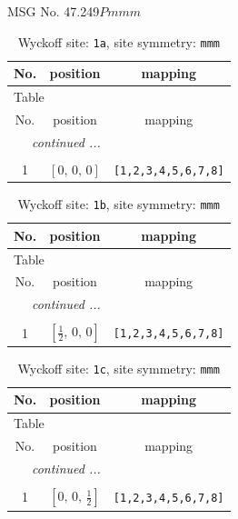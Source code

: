 \documentclass[fleqn,8pt]{jsarticle}
\begin{document}
\setcounter{MaxMatrixCols}{32}

\renewcommand{\tablename}{Table~}
\renewcommand{\figurename}{Figure~}
\begin{center}
\LARGE
MSG No. 47.249\quad$Pmmm$
\end{center}
\renewcommand{\arraystretch}{1.2}
\begin{longtable}{ccc}
\caption{Wyckoff site: {\tt 1a}, site symmetry: {\tt mmm}}
 \\
 \hline \hline
No. & position & mapping \\ \hline \endfirsthead

\multicolumn{2}{l}{\tablename\ \thetable{}} \\
 \hline \hline
No. & position & mapping \\ \hline \endhead

 \hline \hline
\multicolumn{2}{r}{\footnotesize\it continued ...} \\ \endfoot

 \hline \hline
\multicolumn{2}{r}{} \\ \endlastfoot

1 & $\left[ 0,\, 0,\, 0 \right]$ & {\tt [1,2,3,4,5,6,7,8]} \\
\end{longtable}
\renewcommand{\arraystretch}{1.2}
\begin{longtable}{ccc}
\caption{Wyckoff site: {\tt 1b}, site symmetry: {\tt mmm}}
 \\
 \hline \hline
No. & position & mapping \\ \hline \endfirsthead

\multicolumn{2}{l}{\tablename\ \thetable{}} \\
 \hline \hline
No. & position & mapping \\ \hline \endhead

 \hline \hline
\multicolumn{2}{r}{\footnotesize\it continued ...} \\ \endfoot

 \hline \hline
\multicolumn{2}{r}{} \\ \endlastfoot

1 & $\left[ \frac{1}{2},\, 0,\, 0 \right]$ & {\tt [1,2,3,4,5,6,7,8]} \\
\end{longtable}
\renewcommand{\arraystretch}{1.2}
\begin{longtable}{ccc}
\caption{Wyckoff site: {\tt 1c}, site symmetry: {\tt mmm}}
 \\
 \hline \hline
No. & position & mapping \\ \hline \endfirsthead

\multicolumn{2}{l}{\tablename\ \thetable{}} \\
 \hline \hline
No. & position & mapping \\ \hline \endhead

 \hline \hline
\multicolumn{2}{r}{\footnotesize\it continued ...} \\ \endfoot

 \hline \hline
\multicolumn{2}{r}{} \\ \endlastfoot

1 & $\left[ 0,\, 0,\, \frac{1}{2} \right]$ & {\tt [1,2,3,4,5,6,7,8]} \\
\end{longtable}
\end{document}
